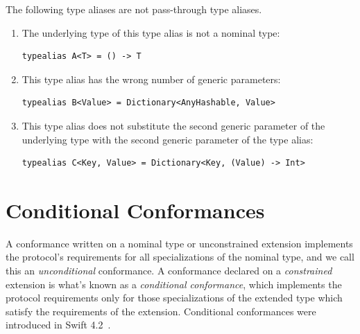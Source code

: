 \documentclass[../generics]{subfiles}
\begin{document}
\begin{example}
The following type aliases are not pass-through type aliases.
\begin{enumerate}
\item The underlying type of this type alias is not a nominal type:
\begin{verbatim}
typealias A<T> = () -> T
\end{verbatim}
\item This type alias has the wrong number of generic parameters:
\begin{verbatim}
typealias B<Value> = Dictionary<AnyHashable, Value>
\end{verbatim}
\item This type alias does not substitute the second generic parameter of the underlying type with the second generic parameter of the type alias:
\begin{verbatim}
typealias C<Key, Value> = Dictionary<Key, (Value) -> Int>
\end{verbatim}
\end{enumerate}
\end{example}

\section{Conditional Conformances}\label{sec:conditional conformances}

A conformance written on a nominal type or unconstrained extension implements the protocol's requirements for all specializations of the nominal type, and we call this an \emph{unconditional} conformance. A conformance declared on a \emph{constrained} extension is what's known as a \emph{conditional conformance}, which implements the protocol requirements only for those specializations of the extended type which satisfy the requirements of the extension. Conditional conformances were introduced in Swift 4.2~\cite{se0143}.
\end{document}
